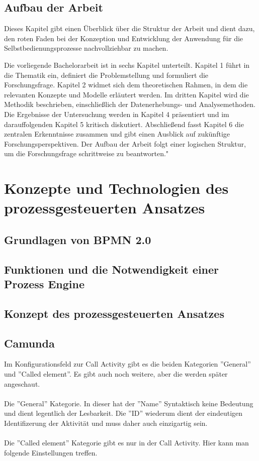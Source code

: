\subsection{Aufbau der Arbeit}
Dieses Kapitel gibt einen Überblick über die Struktur der Arbeit und dient dazu, den roten Faden bei der Konzeption und Entwicklung der Anwendung für die Selbstbedienungsprozesse nachvollziehbar zu machen.

Die vorliegende Bachelorarbeit ist in sechs Kapitel unterteilt. Kapitel 1 führt in die Thematik ein, definiert die Problemstellung und formuliert die Forschungsfrage. Kapitel 2 widmet sich dem theoretischen Rahmen, in dem die relevanten Konzepte und Modelle erläutert werden. Im dritten Kapitel wird die Methodik beschrieben, einschließlich der Datenerhebungs- und Analysemethoden. Die Ergebnisse der Untersuchung werden in Kapitel 4 präsentiert und im darauffolgenden Kapitel 5 kritisch diskutiert. Abschließend fasst Kapitel 6 die zentralen Erkenntnisse zusammen und gibt einen Ausblick auf zukünftige Forschungsperspektiven. Der Aufbau der Arbeit folgt einer logischen Struktur, um die Forschungsfrage schrittweise zu beantworten."

\section{Konzepte und Technologien des prozessgesteuerten Ansatzes}
\subsection{Grundlagen von BPMN 2.0}
\subsection{Funktionen und die Notwendigkeit einer Prozess Engine}
\subsection{Konzept des prozessgesteuerten Ansatzes}

\subsection{Camunda}


Im Konfigurationsfeld zur Call Activity gibt es die beiden Kategorien ''General'' und ''Called element''. Es gibt auch noch weitere, aber die werden später angeschaut. 
\\\\
Die ''General'' Kategorie. In dieser hat der ''Name'' Syntaktisch keine Bedeutung und dient legentlich der Lesbarkeit. Die ''ID'' wiederum dient der eindeutigen Identifizerung der Aktivität und muss daher auch einzigartig sein.
\\\\
Die ''Called element'' Kategorie gibt es nur in der Call Activity. Hier kann man folgende Einstellungen treffen.

